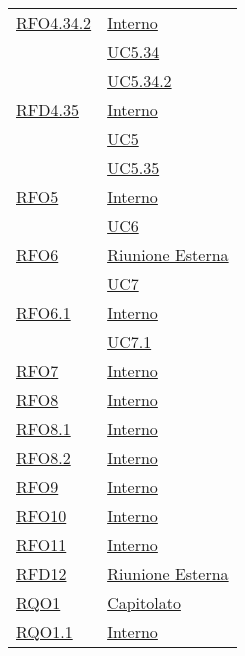 \begin{longtable}{|>{\centering}m{5cm}|m{5cm}<{\centering}|}
\hyperlink{RFO4.34.2}{RFO4.34.2} &  \hyperlink{Interno}{Interno}\\ &\hyperref[UC5.34]{UC5.34}\\ &\hyperref[UC5.34.2]{UC5.34.2}\\ \hline

\hyperlink{RFD4.35}{RFD4.35} &  \hyperlink{Interno}{Interno}\\ &\hyperref[UC5]{UC5}\\ &\hyperref[UC5.35]{UC5.35}\\ \hline

\hyperlink{RFO5}{RFO5} &  \hyperlink{Interno}{Interno}\\  &\hyperref[UC6]{UC6}\\ \hline

\hyperlink{RFO6}{RFO6} &  \hyperlink{Riunione Esterna}{Riunione Esterna}\\  &\hyperref[UC7]{UC7}\\ \hline

\hyperlink{RFO6.1}{RFO6.1} & \hyperlink{Interno}{Interno}\\  &\hyperref[UC7.1]{UC7.1}\\ \hline

\hyperlink{RFO7}{RFO7} &  \hyperlink{Interno}{Interno}\\ \hline

\hyperlink{RFO8}{RFO8} &  \hyperlink{Interno}{Interno}\\ \hline

\hyperlink{RFO8.1}{RFO8.1} &  \hyperlink{Interno}{Interno}\\ \hline

\hyperlink{RFO8.2}{RFO8.2} & \hyperlink{Interno}{Interno}\\ \hline

\hyperlink{RFO9}{RFO9} & \hyperlink{Interno}{Interno}\\ \hline
	
\hyperlink{RFO10}{RFO10} &  \hyperlink{Interno}{Interno}\\ \hline

\hyperlink{RFO11}{RFO11} &  \hyperlink{Interno}{Interno}\\ \hline

\hyperlink{RFD12}{RFD12} &  \hyperlink{Riunione Esterna}{Riunione Esterna}\\ \hline

\hyperlink{RQO1}{RQO1} & \hyperlink{Capitolato}{Capitolato}\\ \hline
\hyperlink{RQO1.1}{RQO1.1} &  \hyperlink{Interno}{Interno}\\ \hline


\end{longtable}
